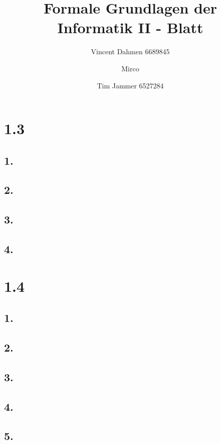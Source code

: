 \documentclass[12pt,a4paper]{article}
\title{Formale Grundlagen der Informatik II - Blatt \blattNr}
\author{Vincent Dahmen 6689845  \and Mirco \and Tim Jammer 6527284}
\begin{document}
\maketitle{}

\section*{1.3}
\subsection*{1.}


\subsection*{2.}


\subsection*{3.}


\subsection*{4.}


\pagebreak

\section*{1.4}
\subsection*{1.}


\subsection*{2.}


\subsection*{3.}


\subsection*{4.}


\subsection*{5.}

\end{document}
